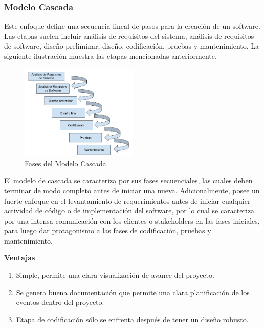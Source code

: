 \subsubsection{Modelo Cascada \label{sec:cascade_model}}

Este enfoque define una secuencia lineal de pasos para la creación de un software. Las etapas suelen incluir análisis de requisitos del sistema, análisis de requisitos de software, diseño preliminar, diseño, codificación, pruebas y mantenimiento. La siguiente ilustración muestra las etapas mencionadas anteriormente.

\begin{figure}[ht]
	\begin{center}
  \includegraphics[width=0.5\textwidth]{./figures/chapter_02/01_cascade_phases.png}
  \caption{Fases del Modelo Cascada}
  \label{fig:cascade_model_phases}
	\end{center}
\end{figure}

El modelo de cascada se caracteriza por sus fases secuenciales, las cuales deben terminar de modo completo antes de iniciar una nueva. Adicionalmente, posee un fuerte enfoque en el levantamiento de requerimientos antes de iniciar cualquier actividad de código o de implementación del software, por lo cual se caracteriza por una intensa comunicación con los clientes o stakeholders en las fases iniciales, para luego dar protagonismo a las fases de codificación, pruebas y mantenimiento.

\textbf{Ventajas}
\begin{enumerate}
  \item Simple, permite una clara visualización de avance del proyecto.
  \item Se genera buena documentación que permite una clara planificación de los eventos dentro del proyecto.
  \item Etapa de codificación sólo se enfrenta después de tener un diseño robusto.
\end{enumerate}

